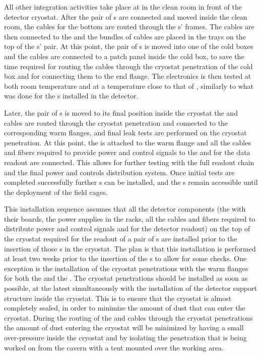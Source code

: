 All other integration activities take place at \surf in the clean room
in front of the detector cryostat. After the pair of s are 
connected and moved inside the clean room, the  cables
for the bottom  are routed through the s' frames.
The cables are then connected to the  and the bundles
of cables are placed in the trays on the top of the s' pair.
At this point, the pair of s is moved into one of the cold
boxes and the cables are connected to a patch panel inside the cold box,
to save the time required for routing the cables through the cryostat
penetration of the cold box and for connecting them to the end flange.
The  electronics is then tested at both room temperature
and at a temperature close to that of \lntwo, similarly to
what was done for the s installed in the  detector.

Later, the pair of s is moved to its final position 
inside the cryostat the 
and  cables are routed through the cryostat penetration and
connected to the corresponding warm flanges, and final leak tests are performed
on the cryostat penetration. At this point, the  is attached
to the warm flange and all the cables and fibers required to provide 
power and control signals to the  and for the data
readout are connected. This allows for further testing with the full 
 readout chain and the final power and controls distribution
system. Once initial tests are completed successfully further s
can be installed, and the s remain accessible until the 
deployment of the field cages.

This installation sequence assumes that all the  detector 
components (the  with their boards, the power supplies in 
the racks, all the cables and fibers required to distribute power and
control signals and for the detector readout) on the top of the cryostat 
required for the readout of a pair of s are installed prior 
to the insertion of those s in the cryostat. The plan is 
that this installation is performed at least two weeks prior to the 
insertion of the s to allow for some checks. One exception
is the installation of the cryostat penetrations with the warm flanges
for both the  and the . The cryostat
penetrations should be installed as soon as possible, at the latest
simultaneously with the installation of the detector support structure
inside the cryostat. This is to ensure that the cryostat is almost 
completely sealed, in order to minimize the amount of dust that can 
enter the cryostat. During the routing of the  and
 cables through the cryostat penetrations the amount
of dust entering the cryostat will be minimized by having a small
over-pressure inside the cryostat and by isolating the penetration
that is being worked on from the cavern with a tent mounted over 
the working area.

